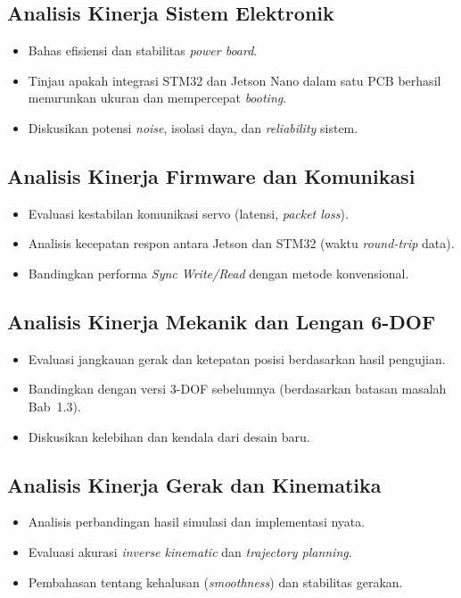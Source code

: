 \subsection{Analisis Kinerja Sistem Elektronik}
\begin{itemize}
    \item Bahas efisiensi dan stabilitas \textit{power board}.
    \item Tinjau apakah integrasi STM32 dan Jetson Nano dalam satu PCB berhasil menurunkan ukuran dan mempercepat \textit{booting}.
    \item Diskusikan potensi \textit{noise}, isolasi daya, dan \textit{reliability} sistem.
\end{itemize}

\subsection{Analisis Kinerja Firmware dan Komunikasi}
\begin{itemize}
    \item Evaluasi kestabilan komunikasi servo (latensi, \textit{packet loss}).
    \item Analisis kecepatan respon antara Jetson dan STM32 (waktu \textit{round-trip} data).
    \item Bandingkan performa \textit{Sync Write/Read} dengan metode konvensional.
\end{itemize}

\subsection{Analisis Kinerja Mekanik dan Lengan 6-DOF}
\begin{itemize}
    \item Evaluasi jangkauan gerak dan ketepatan posisi berdasarkan hasil pengujian.
    \item Bandingkan dengan versi 3-DOF sebelumnya (berdasarkan batasan masalah Bab~1.3).
    \item Diskusikan kelebihan dan kendala dari desain baru.
\end{itemize}

\subsection{Analisis Kinerja Gerak dan Kinematika}
\begin{itemize}
    \item Analisis perbandingan hasil simulasi dan implementasi nyata.
    \item Evaluasi akurasi \textit{inverse kinematic} dan \textit{trajectory planning}.
    \item Pembahasan tentang kehalusan (\textit{smoothness}) dan stabilitas gerakan.
\end{itemize}

